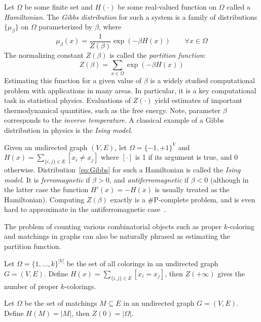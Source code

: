 \documentclass[final,12pt]{colt2018}
\begin{document}
Let $\Omega$ be some finite set and $H(\cdot)$ be some real-valued function on $\Omega$
called a {\em Hamiltonian}. The {\em Gibbs distribution} for such a system is a family of distributions $\{\mu_\beta\}$ on $\Omega$ parameterized by $\beta$, where %
\begin{equation}
\mu_\beta(x)=\frac{1}{Z(\beta)} \exp(-\beta H(x))\qquad \forall x\in\Omega   \label{eq:Gibbs}
\end{equation}
The normalizing constant $Z(\beta)$ is called the {\em partition function}:
\begin{equation}
Z(\beta)=\sum_{x\in\Omega} \exp(-\beta H(x))
\end{equation}
Estimating this function for a given value of $\beta$ is a widely studied computational problem
with applications in many areas. 
In particular, it is a key computational task in statistical physics.
Evaluations of $Z(\cdot)$ yield estimates of important thermodynamical quantities, such as the free energy. 
Note, parameter $\beta$ corresponds to the {\em inverse temperature}.
A classical example of a Gibbs distribution in physics
is  the {\em Ising model}.
\begin{example}\label{ex:Ising}%
Given an undirected graph $(V,E)$, let $\Omega=\{-1,+1\}^V$ and $H(x)=\sum_{\{i,j\}\in E} [x_i\ne x_j]$
where $[\cdot]$ is 1 if its argument is true, and 0 otherwise.
Distribution~\eqref{eq:Gibbs} for such a Hamiltonian is called the {\em Ising model}.
It is  {\em ferromagnetic} if $\beta>0$, and {\em antiferromagnetic} if $\beta<0$
(although in the latter case the function $H'(x)=-H(x)$ is usually treated as the Hamiltonian).
Computing $Z(\beta)$ exactly is a $\#$P-complete problem, and is even hard to approximate in the antiferromagnetic
case~\citep{JerrumSinclair:Ising}.
\end{example}
The problem of counting various combinatorial objects such as  proper $k$-coloring and matchings in graphs can also be naturally phrased
as estimating the partition function.
\begin{example}\label{ex:colorings}
Let $\Omega=\{1,\ldots,k\}^{|V|}$ be the set of all colorings in 
an undirected graph $G=(V,E)$.
Define  $H(x)=\sum_{\{i,j\}\in E}[x_i=x_j]$, then $Z(+\infty)$ gives the number of proper $k$-colorings.
\end{example}
\begin{example}\label{eq:matchings}
Let $\Omega$ be the set of matchings $M\subseteq E$ in 
an undirected graph $G=(V,E)$.
Define  $H(M)=|M|$, then $Z(0)=|\Omega|$.
\end{example}
\end{document}
